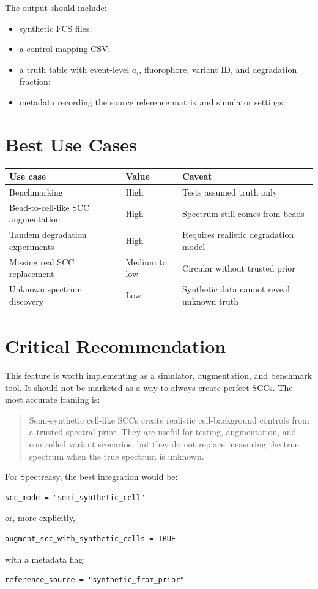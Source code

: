 \documentclass[11pt]{article}
\begin{document}
The output should include:
\begin{itemize}
  \item synthetic FCS files;
  \item a control mapping CSV;
  \item a truth table with event-level \(a_i\), fluorophore, variant ID, and
        degradation fraction;
  \item metadata recording the source reference matrix and simulator settings.
\end{itemize}

\section{Best Use Cases}

\begin{table}[h!]
\centering
\begin{tabular}{@{}lll@{}}
\toprule
Use case & Value & Caveat \\
\midrule
Benchmarking & High & Tests assumed truth only \\
Bead-to-cell-like SCC augmentation & High & Spectrum still comes from beads \\
Tandem degradation experiments & High & Requires realistic degradation model \\
Missing real SCC replacement & Medium to low & Circular without trusted prior \\
Unknown spectrum discovery & Low & Synthetic data cannot reveal unknown truth \\
\bottomrule
\end{tabular}
\end{table}

\section{Critical Recommendation}

This feature is worth implementing as a simulator, augmentation, and benchmark
tool. It should not be marketed as a way to always create perfect SCCs. The most
accurate framing is:
\begin{quote}
Semi-synthetic cell-like SCCs create realistic cell-background controls from a
trusted spectral prior. They are useful for testing, augmentation, and controlled
variant scenarios, but they do not replace measuring the true spectrum when the
true spectrum is unknown.
\end{quote}

For Spectreasy, the best integration would be:
\begin{verbatim}
scc_mode = "semi_synthetic_cell"
\end{verbatim}
or, more explicitly,
\begin{verbatim}
augment_scc_with_synthetic_cells = TRUE
\end{verbatim}
with a metadata flag:
\begin{verbatim}
reference_source = "synthetic_from_prior"
\end{verbatim}
\end{document}
